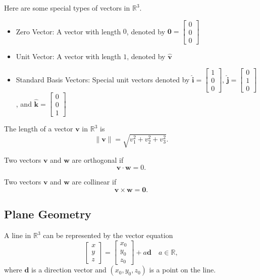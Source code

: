 \documentclass[11pt]{scrartcl}
\theoremstyle{plain}
\theoremstyle{definition}
\theoremstyle{remark}
\begin{document}
Here are some special types of vectors in $\mathbb{R}^{3}$.

\begin{itemize}
    \item Zero Vector: A vector with length $0$, denoted by $\mathbf{0}=\begin{bmatrix}0 \\ 0 \\ 0\end{bmatrix}$
    \item Unit Vector: A vector with length $1$, denoted by $\hat{\mathbf{v}}$
    \item Standard Basis Vectors: Special unit vectors denoted by $\hat{\mathbf{i}}=\begin{bmatrix}1 \\ 0 \\ 0
    \end{bmatrix}$, $\hat{\mathbf{j}}=\begin{bmatrix}0 \\ 1 \\ 0\end{bmatrix}$, and $\hat{\mathbf{k}}=\begin{bmatrix}
    0 \\ 0 \\ 1\end{bmatrix}$
\end{itemize}

The length of a vector $\mathbf{v}$ in $\mathbb{R}^{3}$ is 
\[ \lVert \mathbf{v} \rVert  =\sqrt{ v_{1}^{2}+v_{2}^{2}+v_{3}^{2} }. \]

Two vectors $\mathbf{v}$ and $\mathbf{w}$ are orthogonal if
\[ \mathbf{v}\cdot \mathbf{w}=0. \]

Two vectors $\mathbf{v}$ and $\mathbf{w}$ are collinear if
\[ \mathbf{v}\times \mathbf{w}=\mathbf{0}. \]

\subsection{Plane Geometry}

A line in $\mathbb{R}^{3}$ can be represented by the vector equation
\[ \begin{bmatrix}x \\ y \\z\end{bmatrix}=\begin{bmatrix}x_{0} \\ y_{0} \\z_{0}\end{bmatrix}+a\mathbf{d}\quad a\in 
\mathbb{R}, \]
where $\mathbf{d}$ is a direction vector and $(x_{0},y_{0},z_{0})$ is a point on the line. \\
\end{document}
